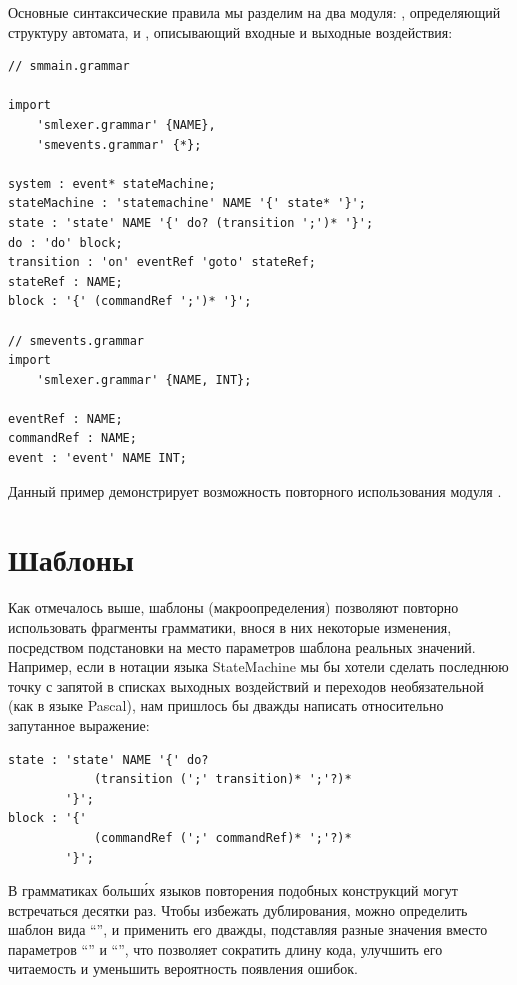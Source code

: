 Основные синтаксические правила мы разделим на два модуля: , определяющий структуру автомата, и , описывающий входные и выходные воздействия:
\begin{lstlisting}
// smmain.grammar

import 
	'smlexer.grammar' {NAME},
	'smevents.grammar' {*};

system : event* stateMachine;
stateMachine : 'statemachine' NAME '{' state* '}';
state : 'state' NAME '{' do? (transition ';')* '}';
do : 'do' block;
transition : 'on' eventRef 'goto' stateRef;
stateRef : NAME;
block : '{' (commandRef ';')* '}';

// smevents.grammar
import 
	'smlexer.grammar' {NAME, INT};
	
eventRef : NAME;
commandRef : NAME;
event : 'event' NAME INT;
\end{lstlisting}
Данный пример демонстрирует возможность повторного использования модуля .

\chapter{Шаблоны}

Как отмечалось выше, шаблоны (макроопределения) позволяют повторно использовать фрагменты грамматики, внося в них некоторые изменения, посредством подстановки на место параметров шаблона реальных значений. Например, если в нотации языка StateMachine мы бы хотели сделать последнюю точку с запятой в списках выходных воздействий и переходов необязательной (как в языке Pascal), нам пришлось бы дважды написать относительно запутанное выражение:
\begin{lstlisting}
state : 'state' NAME '{' do? 
			(transition (';' transition)* ';'?)* 
		'}';
block : '{' 
			(commandRef (';' commandRef)* ';'?)* 
		'}';
\end{lstlisting}

В грамматиках больш\'{и}х языков повторения подобных конструкций могут встречаться десятки раз. Чтобы избежать дублирования, можно определить шаблон вида ``'', и применить его дважды, подставляя разные значения вместо параметров ``'' и ``'', что позволяет сократить длину кода, улучшить его читаемость и уменьшить вероятность появления ошибок.

